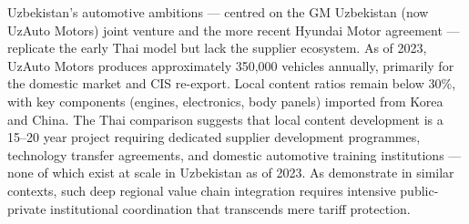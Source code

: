 Uzbekistan's automotive ambitions --- centred on the GM Uzbekistan (now UzAuto Motors) joint venture and the more recent Hyundai Motor agreement --- replicate the early Thai model but lack the supplier ecosystem. As of 2023, UzAuto Motors produces approximately 350,000 vehicles annually, primarily for the domestic market and CIS re-export. Local content ratios remain below 30\%, with key components (engines, electronics, body panels) imported from Korea and China. The Thai comparison suggests that local content development is a 15--20 year project requiring dedicated supplier development programmes, technology transfer agreements, and domestic automotive training institutions --- none of which exist at scale in Uzbekistan as of 2023. As \citet{kaplinsky2001} demonstrate in similar contexts, such deep regional value chain integration requires intensive public-private institutional coordination that transcends mere tariff protection.
